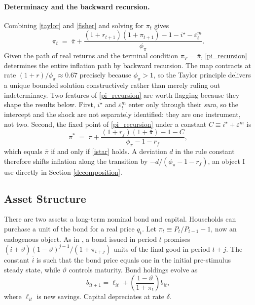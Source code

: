 \paragraph{Determinacy and the backward recursion.} Combining \eqref{taylor}
and \eqref{fisher} and solving for $\pi_t$ gives
\begin{equation}\label{pi_recursion}
  \pi_t \;=\; \bar\pi + \frac{(1+r_{t+1})(1+\pi_{t+1}) - 1 - i^\star - \varepsilon^m_t}{\phi_\pi}.
\end{equation}
Given the path of real returns and the terminal condition $\pi_T=\bar\pi$,
\eqref{pi_recursion} determines the entire inflation path by backward
recursion. The map contracts at rate $(1+r)/\phi_\pi \approx 0.67$ precisely
because $\phi_\pi>1$, so the Taylor principle delivers a unique bounded
solution constructively rather than merely ruling out indeterminacy. Two
features of \eqref{pi_recursion} are worth flagging because they shape the
results below. First, $i^\star$ and $\varepsilon^m_t$ enter only through their
\emph{sum}, so the intercept and the shock are not separately identified: they
are one instrument, not two. Second, the fixed point of \eqref{pi_recursion}
under a constant $C \equiv i^\star + \varepsilon^m$ is
\begin{equation}\label{fixed_point}
  \pi^\ast \;=\; \bar\pi + \frac{(1+r_f)(1+\bar\pi)-1-C}{\phi_\pi - 1 - r_f},
\end{equation}
which equals $\bar\pi$ if and only if \eqref{istar} holds. A deviation
$d$ in the rule constant therefore shifts inflation along the transition by
$-d/(\phi_\pi-1-r_f)$, an object I use directly in Section
\ref{decomposition}.

\subsection{Asset Structure}
There are two assets: a long-term nominal bond and capital. Households can
purchase a unit of the bond for a real price $q_t$. Let
$\pi_t\equiv P_t/P_{t-1}-1$, now an endogenous object. As in
\textcite{Hatchondo-Martinez-09}, a bond issued in period $t$ promises
$(\bar i+\vartheta)(1-\vartheta)^{j-1}/(1+\pi_{t+j})$ units of the final good in
period $t+j$. The constant $\bar i$ is such that the bond price equals one in
the initial pre-stimulus steady state, while $\vartheta$ controls maturity.
Bond holdings evolve as
\begin{equation}
    b_{it+1} = \ell_{it} + \left(\frac{1-\vartheta}{1+\pi_{t}}\right) b_{it},
\end{equation}
where $\ell_{it}$ is new savings. Capital depreciates at rate $\delta$.

